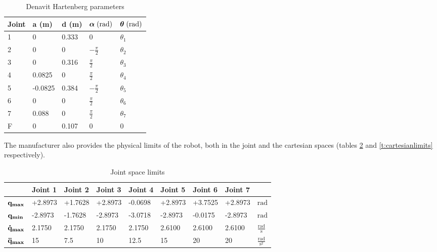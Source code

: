 \begin{table}[H]
    \caption[Denavit Hartenberg parameters]{
        Denavit Hartenberg parameters \cite{FrankaEmikaPanda}
    }
    \begin{center}
    \begin{tabular}{|l|l|l|l|l|}
    \hline
        \textbf{Joint} & \textbf{a} (m) & \textbf{d} (m) & \(\mbox{\boldmath$\alpha$}\;(\text{rad})\) & \(\mbox{\boldmath$\theta$}\;(\text{rad})\) \\ \hline \hline
        1 & 0 & 0.333 & 0 & \(\theta_1\) \\ \hline
        2 & 0 & 0 & \(-\frac{\pi}{2}\) & \(\theta_2\) \\ \hline
        3 & 0 & 0.316 & \(\frac{\pi}{2}\) & \(\theta_3\) \\ \hline
        4 & 0.0825 & 0 & \(\frac{\pi}{2}\) & \(\theta_4\) \\ \hline
        5 & -0.0825 & 0.384 & \(-\frac{\pi}{2}\) & \(\theta_5\) \\ \hline
        6 & 0 & 0 & \(\frac{\pi}{2}\) & \(\theta_6\) \\ \hline
        7 & 0.088 & 0 & \(\frac{\pi}{2}\) & \(\theta_7\) \\ \hline
        F & 0 & 0.107 & 0 & 0 \\ \hline
    \end{tabular}
    \end{center}
\label{t:dh}
\end{table}

The manufacturer also provides the physical limits of the robot, both in the joint and the cartesian spaces (tables \ref{t:jointlimits} and \ref{t:cartesianlimits} respectively).

\begin{table}[H]
    \caption[Joint space limits]{
        Joint space limits \cite{FrankaEmikaPanda}
    }
    \begin{center}
    \begin{tabular}{|l|l|l|l|l|l|l|l|l|}
    \hline
         & Joint 1 & Joint 2 & Joint 3 & Joint 4 & Joint 5 & Joint 6 & Joint 7 & \\ \hline \hline
        \(\bf{q_{max}}\) & +2.8973 & +1.7628 & +2.8973 & -0.0698 & +2.8973 & +3.7525 & +2.8973 & \(\text{rad}\) \\ \hline
        \(\bf{q_{min}}\) & -2.8973 & -1.7628 & -2.8973 & -3.0718 & -2.8973 & -0.0175 & -2.8973 & \(\text{rad}\) \\ \hline
        \(\bf{\dot{q}_{max}}\) & 2.1750 & 2.1750 & 2.1750 & 2.1750 & 2.6100 & 2.6100 & 2.6100 & \(\frac{\text{rad}}{\text{s}}\) \\ \hline
        \(\bf{\ddot{q}_{max}}\) & 15 & 7.5 & 10 & 12.5 & 15 & 20 & 20 & \(\frac{\text{rad}}{\text{s}^2}\) \\ \hline
    \end{tabular}
\end{center}
\label{t:jointlimits}
\end{table}


